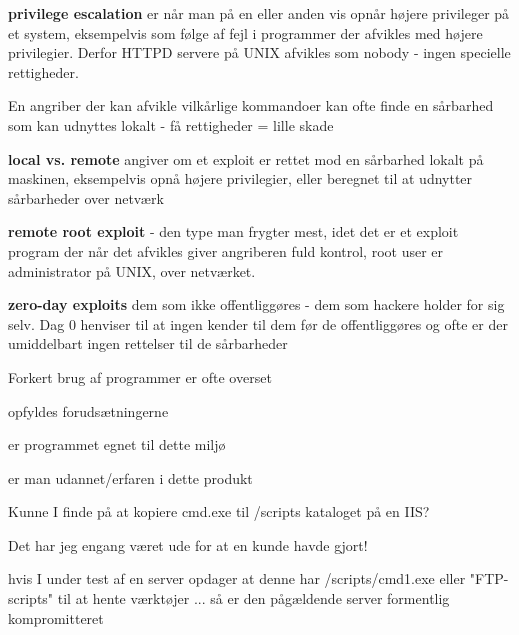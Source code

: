 \documentclass[20pt,landscape,a4paper,footrule]{foils}
\begin{document}
\begin{list1}
\item {\bfseries privilege escalation} er når man på en eller anden vis
opnår højere privileger på et system, eksempelvis som
følge af fejl i programmer der afvikles med højere
privilegier. Derfor HTTPD servere på UNIX afvikles som
nobody - ingen specielle rettigheder.
\item En angriber der kan afvikle vilkårlige kommandoer kan ofte finde
  en sårbarhed som kan udnyttes lokalt - få rettigheder = lille skade
\end{list1}



\begin{list1} 
\item {\bfseries local vs. remote}
angiver om et exploit er rettet mod
en sårbarhed lokalt på maskinen, eksempelvis
opnå højere privilegier, eller beregnet
til at udnytter sårbarheder over netværk
\item {\bfseries remote root exploit} 
- den type man frygter mest, idet
det er et exploit program der når det afvikles giver
angriberen fuld kontrol, root user er administrator
på UNIX, over netværket. 
\item {\bfseries zero-day exploits} dem som ikke offentliggøres - dem
  som hackere holder for sig selv. Dag 0 henviser til at ingen kender
  til dem før de offentliggøres og ofte er der umiddelbart ingen
  rettelser til de sårbarheder
\end{list1}


\begin{list1}
\item Forkert brug af programmer er ofte overset
\begin{list2}
\item opfyldes forudsætningerne
\item er programmet egnet til dette miljø
\item er man udannet/erfaren i dette produkt
\end{list2}
\item Kunne I finde på at kopiere cmd.exe til
/scripts kataloget på en IIS?
\item Det har jeg engang været ude for at en kunde havde gjort!
\item hvis I under test af en server opdager at denne har
  /scripts/cmd1.exe eller "FTP-scripts" til at hente værktøjer ...
så er den pågældende server formentlig kompromitteret 
\end{list1}
\end{document}
